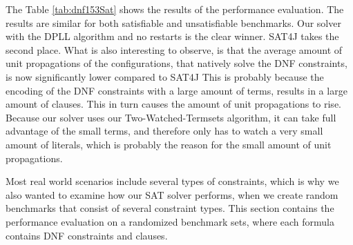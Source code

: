 \documentclass{easychair}
\begin{document}
The Table \ref{tab:dnf153Sat} shows the results of the performance evaluation. The results are similar for both satisfiable and unsatisfiable benchmarks.
Our solver with the DPLL algorithm and no restarts is the clear winner. SAT4J takes the second place. What is also interesting to observe, is that the average amount of unit propagations of the configurations, that natively solve the DNF constraints, is now significantly lower compared to SAT4J
This is probably because the encoding of the DNF constraints with a large amount of terms, results in a large amount of clauses. This in turn causes the amount of unit propagations to rise. Because our solver uses our Two-Watched-Termsets algorithm, it can take full advantage of the small terms, and therefore only has to watch a very small amount of literals, which is probably the reason for the small amount of unit propagations.

Most real world scenarios include several types of constraints, which is why we also wanted to examine how our SAT solver performs, when we create random benchmarks that consist of several constraint types. This section contains the performance evaluation on a randomized benchmark sets, where each formula contains DNF constraints and clauses.
\end{document}
